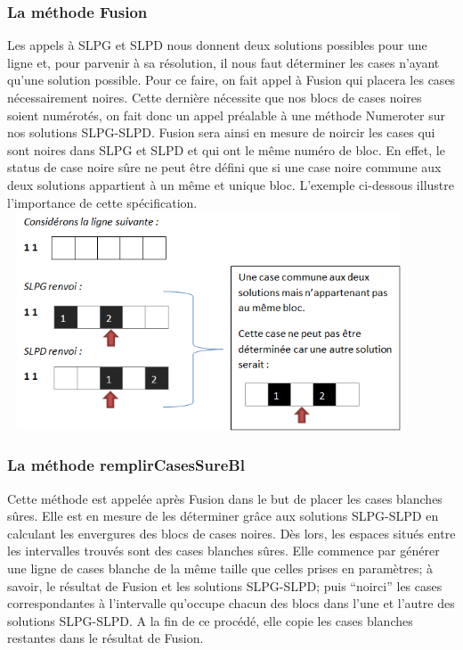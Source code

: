 \documentclass{article}
\begin{document}
\subsubsection{La méthode Fusion}
Les appels à SLPG et SLPD nous donnent deux solutions possibles pour une ligne et, pour parvenir à sa résolution, il nous faut déterminer les cases n'ayant qu'une solution possible. 
\newline
Pour ce faire, on fait appel à Fusion qui placera les cases nécessairement noires.
Cette dernière nécessite que nos blocs de cases noires soient numérotés, on fait donc un appel préalable à une méthode Numeroter sur nos solutions SLPG-SLPD.
\newline
Fusion sera ainsi en mesure de noircir les cases qui sont noires dans SLPG et SLPD et qui ont le même numéro de bloc.
En effet, le status de case noire sûre ne peut être défini que si une case noire commune aux deux solutions appartient à un même et unique bloc.
\newline
L'exemple ci-dessous illustre l'importance de cette spécification.  
\newline
\includegraphics[height=6.5cm,width=12cm]{Exemple1}
\subsubsection{La méthode remplirCasesSureBl}
Cette méthode est appelée après Fusion dans le but de placer les cases blanches sûres. Elle est en mesure de les déterminer grâce aux solutions SLPG-SLPD en calculant les envergures des blocs de cases noires. Dès lors, les espaces situés entre les intervalles trouvés sont des cases blanches sûres.\newline
Elle commence par générer une ligne de cases blanche de la même taille que celles prises en paramètres; à savoir, le résultat de Fusion et les solutions SLPG-SLPD; puis ``noirci'' les cases correspondantes à l'intervalle qu'occupe chacun des blocs dans l'une et l'autre des solutions SLPG-SLPD.
\newline
A la fin de ce procédé, elle copie les cases blanches restantes dans le résultat de Fusion.
\end{document}

